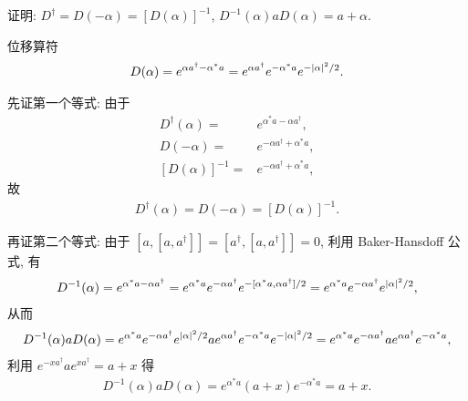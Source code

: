 \documentclass{assignment}
\begin{document}
\begin{prob}
    证明: $D^{\dagger}=D(-\alpha)=[D(\alpha)]^{-1}$, $D^{-1}(\alpha)aD(\alpha)=a+\alpha$.
\end{prob}
\begin{pf}
    位移算符
    \begin{align}
        D(\alpha)=e^{\alpha a^{\dagger}-\alpha^*a}=e^{\alpha a^{\dagger}}e^{-\alpha^*a}e^{-\left\lvert\alpha\right\rvert^2/2}.
    \end{align}

    先证第一个等式: 由于
    \begin{align}
        D^{\dagger}(\alpha)=&e^{\alpha^*a-\alpha a^{\dagger}},\\
        D(-\alpha)=&e^{-\alpha a^{\dagger}+\alpha^*a},\\
        [D(\alpha)]^{-1}=&e^{-\alpha a^{\dagger}+\alpha^*a},
    \end{align}
    故
    \begin{align}
        D^{\dagger}(\alpha)=D(-\alpha)=[D(\alpha)]^{-1}.
    \end{align}

    再证第二个等式: 由于 $[a,[a,a^{\dagger}]]=[a^{\dagger},[a,a^{\dagger}]]=0$, 利用 Baker-Hansdoff 公式, 有
    \begin{align}
        D^{-1}(\alpha)=e^{\alpha^*a-\alpha a^{\dagger}}=e^{\alpha^*a}e^{-\alpha a^{\dagger}}e^{-[\alpha^*a,\alpha a^{\dagger}]/2}=e^{\alpha^*a}e^{-\alpha a^{\dagger}}e^{\left\lvert\alpha\right\rvert^2/2},
    \end{align}
    从而
    \begin{align}
        D^{-1}(\alpha)aD(\alpha)=e^{\alpha^*a}e^{-\alpha a^{\dagger}}e^{\left\lvert\alpha\right\rvert^2/2}ae^{\alpha a^{\dagger}}e^{-\alpha^*a}e^{-\left\lvert\alpha\right\rvert^2/2}=e^{\alpha^*a}e^{-\alpha a^{\dagger}}ae^{\alpha a^{\dagger}}e^{-\alpha^*a},
    \end{align}
    利用 $e^{-xa^{\dagger}}ae^{xa^{\dagger}}=a+x$ 得
    \begin{align}
        D^{-1}(\alpha)aD(\alpha)=e^{\alpha^*a}(a+x)e^{-\alpha^*a}=a+x.
    \end{align}
\end{pf}
\end{document}
